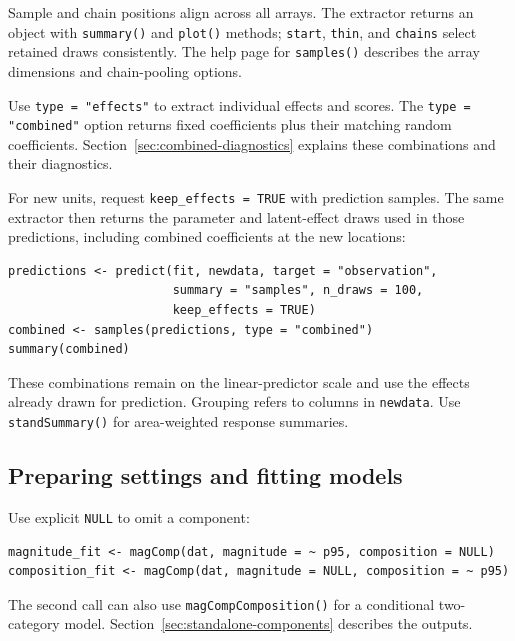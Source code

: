 \documentclass[11pt]{article}
\begin{document}
Sample and chain positions align across all arrays. The extractor returns an
object with \texttt{summary()} and \texttt{plot()} methods; \texttt{start},
\texttt{thin}, and \texttt{chains} select retained draws consistently.
The help page for \texttt{samples()} describes the array dimensions and
chain-pooling options.

Use \texttt{type = "effects"} to extract individual effects and scores.
The \texttt{type = "combined"} option returns fixed coefficients plus their
matching random coefficients. Section~\ref{sec:combined-diagnostics} explains
these combinations and their diagnostics.

For new units, request \texttt{keep\_effects = TRUE} with prediction samples.
The same extractor then returns the parameter and latent-effect draws used
in those predictions, including combined coefficients at the new locations:
\begin{verbatim}
predictions <- predict(fit, newdata, target = "observation",
                       summary = "samples", n_draws = 100,
                       keep_effects = TRUE)
combined <- samples(predictions, type = "combined")
summary(combined)
\end{verbatim}
These combinations remain on the linear-predictor scale and use the effects
already drawn for prediction. Grouping refers to columns in \texttt{newdata}.
Use \texttt{standSummary()} for area-weighted response summaries.

\subsection{Preparing settings and fitting models}
\label{sec:settings}

Use explicit \texttt{NULL} to omit a component:
\begin{verbatim}
magnitude_fit <- magComp(dat, magnitude = ~ p95, composition = NULL)
composition_fit <- magComp(dat, magnitude = NULL, composition = ~ p95)
\end{verbatim}
The second call can also use \texttt{magCompComposition()} for a conditional
two-category model. Section~\ref{sec:standalone-components} describes the outputs.
\end{document}
